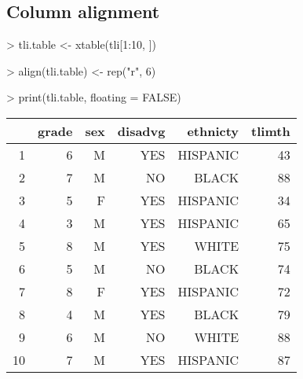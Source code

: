 \documentclass[letterpaper]{article}
\begin{document}
\subsection{Column alignment}

\begin{Schunk}
\begin{Sinput}
> tli.table <- xtable(tli[1:10, ])
\end{Sinput}
\end{Schunk}
\begin{Schunk}
\begin{Sinput}
> align(tli.table) <- rep("r", 6)
\end{Sinput}
\end{Schunk}
\begin{Schunk}
\begin{Sinput}
> print(tli.table, floating = FALSE)
\end{Sinput}
% latex table generated in R 2.6.0 by xtable 1.5-2 package
% Wed Oct 10 14:26:37 2007
\begin{tabular}{rrrrrr}
  \hline
 & grade & sex & disadvg & ethnicty & tlimth \\
  \hline
1 &   6 & M & YES & HISPANIC &  43 \\
  2 &   7 & M & NO & BLACK &  88 \\
  3 &   5 & F & YES & HISPANIC &  34 \\
  4 &   3 & M & YES & HISPANIC &  65 \\
  5 &   8 & M & YES & WHITE &  75 \\
  6 &   5 & M & NO & BLACK &  74 \\
  7 &   8 & F & YES & HISPANIC &  72 \\
  8 &   4 & M & YES & BLACK &  79 \\
  9 &   6 & M & NO & WHITE &  88 \\
  10 &   7 & M & YES & HISPANIC &  87 \\
   \hline
\end{tabular}\end{Schunk}
\end{document}
